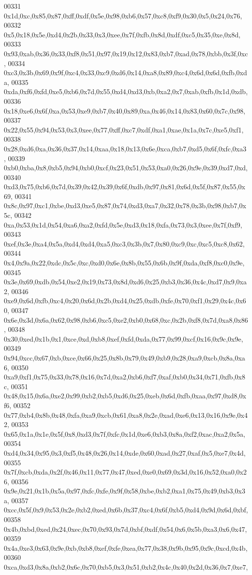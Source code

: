 \begin{DoxyCode}
00331   0x1d,0xc,0x85,0x87,0xff,0xdf,0x5e,0x98,0xb6,0x57,0xc8,0xf9,0x30,0x5,0x24,0x76,
00332   0x5,0x18,0x5e,0xd4,0x2b,0x33,0x3,0xee,0x7f,0xfb,0x8d,0xdf,0xc5,0x35,0xe,0x8d,
00333   0x93,0xab,0x36,0x33,0xf8,0x51,0x97,0x19,0x12,0x83,0xb7,0xad,0x78,0xbb,0x3f,0xc,
00334   0xc3,0x3b,0x69,0x9f,0xc4,0x33,0xc9,0xd6,0x14,0xa8,0x89,0xc4,0x6d,0x6d,0xfb,0xda,
00335   0xda,0xf6,0xfd,0xe5,0xb6,0x7d,0x55,0xd4,0xd3,0xb,0xa2,0x7,0xab,0xfb,0x1d,0xdb,
00336   0x18,0xe6,0x6f,0xa,0x53,0xe9,0xb7,0x40,0x89,0xa,0x46,0x14,0x83,0x60,0x7c,0x98,
00337   0x22,0x55,0x94,0x53,0x3,0xee,0x77,0xff,0xc7,0xdf,0xa1,0xae,0x1a,0x7c,0xe5,0xf1,
00338   0x28,0xd6,0xa,0x36,0x37,0x14,0xaa,0x18,0x13,0x6e,0xca,0xb7,0xd5,0x6f,0xfc,0xa3,
00339   0xb0,0xba,0x8,0xb5,0x94,0xb0,0xcf,0x23,0x51,0x53,0xa0,0x26,0x9e,0x39,0xd7,0xd,
00340   0xd3,0x75,0xb6,0x7d,0x39,0x42,0x39,0x6f,0xdb,0x97,0x81,0x6d,0x5f,0x87,0x55,0x69,
00341   0x8c,0x97,0xc1,0xbe,0xd3,0xe5,0x87,0x74,0xd3,0xa7,0x32,0x78,0x3b,0x98,0xb7,0x5c,
00342   0xa,0x53,0x1d,0x54,0xa6,0xa2,0xfd,0x5e,0xd3,0x18,0xfa,0x73,0x3,0xee,0x7f,0xf9,
00343   0xef,0x3e,0xa4,0x5a,0xd4,0xd4,0xa5,0xc3,0x3b,0x7,0x80,0xc9,0xc,0xc5,0xc8,0x62,
00344   0x4,0x9a,0x22,0xdc,0x5c,0xc,0xd0,0x6e,0x8b,0x55,0x6b,0x9f,0xda,0xf8,0xc0,0x9e,
00345   0x3e,0x69,0xdb,0x54,0xe2,0x19,0x73,0x8d,0xd6,0x25,0xb3,0x36,0x4c,0xd7,0x9,0xa2,
00346   0xe9,0x6d,0xfb,0xc4,0x20,0x6d,0x2b,0xd4,0x25,0xdb,0xfe,0x70,0xf1,0x29,0x4c,0x60,
00347   0x6e,0x3d,0x6a,0x62,0x98,0xb6,0xc5,0xe2,0xb0,0x68,0xc,0x2b,0xf8,0x7d,0xa8,0x86,
00348   0x30,0xed,0x1b,0x1,0xce,0xd,0xb8,0xef,0xfd,0xda,0x77,0x99,0xcf,0x16,0x9c,0x9e,
00349   0x94,0xcc,0x67,0xb,0xce,0x66,0x25,0x8b,0x79,0x49,0xb9,0x28,0xa9,0xcb,0x8a,0xa6,
00350   0xa9,0xf1,0x75,0x33,0x78,0x16,0x7d,0xa2,0xb6,0xf7,0xaf,0xb0,0x34,0x71,0xfb,0x8c,
00351   0x48,0x15,0x6a,0xe2,0x99,0xb2,0xb5,0xd6,0x25,0xeb,0x6d,0xfb,0xaa,0x97,0xd8,0xf6,
00352   0x77,0xb4,0x8b,0x48,0xfa,0xa9,0xcb,0x61,0xa8,0x2e,0xad,0xe6,0x13,0x16,0x9e,0x42,
00353   0x65,0x1a,0x1e,0x5f,0x8,0xd3,0x7f,0xfc,0x1d,0xe6,0xb3,0x8a,0xf2,0xac,0xa2,0x5a,
00354   0xd4,0x34,0x95,0x3,0xf5,0x48,0x26,0x14,0xde,0x60,0xad,0x27,0xaf,0x5,0xe7,0x4d,
00355   0x7f,0xcb,0xda,0x2f,0x46,0x11,0x77,0x47,0xed,0xe0,0x69,0x3d,0x16,0x52,0xa0,0x26,
00356   0x9e,0x21,0x1b,0x5a,0x97,0xfc,0xfe,0x9f,0x58,0xbe,0xb2,0xa1,0x75,0x49,0xb3,0x3a,
00357   0xcc,0x5f,0x9,0x53,0x2e,0xb2,0xed,0x6b,0x37,0xc4,0x6f,0xb5,0xd4,0x9d,0x6d,0xbf,
00358   0x4b,0xbd,0xed,0x24,0xec,0x70,0x93,0x7d,0xbf,0xdf,0x54,0x6,0x5b,0xa3,0x6,0x47,
00359   0x4a,0xe3,0x63,0x9e,0xb,0xb8,0xef,0xfe,0xea,0x77,0x38,0x9b,0x95,0x9c,0xcd,0x4b,
00360   0xca,0xd3,0x8a,0xb2,0x6c,0x70,0xb5,0x3,0x51,0xb2,0x4c,0x40,0x2d,0x36,0x7,0xe7,

\end{DoxyCode}
